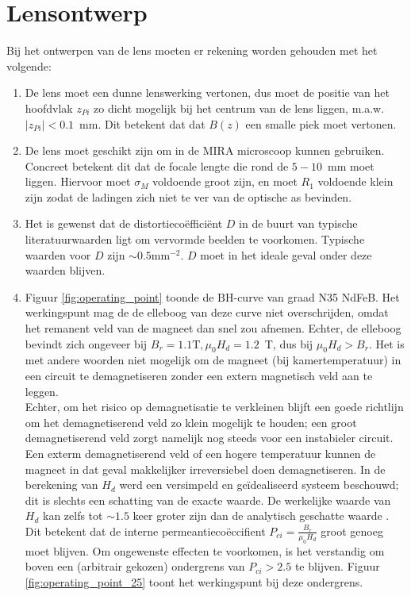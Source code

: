 \documentclass[we,twoside,openright,a4paper,11pt]{uantwerpenbamathesis}
\begin{document}
\section{Lensontwerp}\label{ch:lensontwerp}
Bij het ontwerpen van de lens moeten er rekening worden gehouden met het volgende:
\begin{enumerate}
    \item De lens moet een dunne lenswerking vertonen, dus moet de positie van het hoofdvlak $z_{Pi}$ zo dicht mogelijk bij het centrum van de lens liggen, m.a.w. $\left|z_{Pi}\right|<0.1$~mm. Dit betekent dat dat $B(z)$ een smalle piek moet vertonen.

    \item De lens moet geschikt zijn om in de MIRA microscoop kunnen gebruiken. Concreet betekent dit dat de focale lengte die rond de $5-10$~mm moet liggen. Hiervoor moet $\sigma_M$ voldoende groot zijn, en moet $R_1$ voldoende klein zijn zodat de ladingen zich niet te ver van de optische as bevinden.
    
    \item Het is gewenst dat de distortiecoëfficiënt $D$ in de buurt van typische literatuurwaarden ligt om vervormde beelden te voorkomen. Typische waarden voor $D$ zijn $\sim0.5\mathrm{mm}^{-2}$\cite{Abbas_2016}. $D$ moet in het ideale geval onder deze waarden blijven.

    \item Figuur \ref{fig:operating_point} toonde de $\mathrm{BH}$-curve van graad N35 NdFeB. Het werkingspunt mag de de elleboog van deze curve niet overschrijden, omdat het remanent veld van de magneet dan snel zou afnemen. Echter, de elleboog bevindt zich ongeveer bij $B_r=1.1\mathrm{T}, \mu_0 H_d = 1.2$~T, dus bij $\mu_0 H_d>B_r$. Het is met andere woorden niet mogelijk om de magneet (bij kamertemperatuur) in een circuit te demagnetiseren zonder een extern magnetisch veld aan te leggen.\\

    Echter, om het risico op demagnetisatie te verkleinen blijft een goede richtlijn om het demagnetiserend veld zo klein mogelijk te houden; een groot demagnetiserend veld zorgt namelijk nog steeds voor een instabieler circuit. Een exterm demagnetiserend veld of een hogere temperatuur kunnen de magneet in dat geval makkelijker irreversiebel doen demagnetiseren. In de berekening van $H_d$ werd een versimpeld en geïdealiseerd systeem beschouwd; dit is slechts een schatting van de exacte waarde. De werkelijke waarde van $H_d$ kan zelfs tot $\sim1.5$ keer groter zijn dan de analytisch geschatte waarde \cite{MagnetFAQ}. Dit betekent dat de interne permeantiecoëccifient $P_{ci}=\frac{B_r}{\mu_0 H_d}$ groot genoeg moet blijven. Om ongewenste effecten te voorkomen, is het verstandig om boven een (arbitrair gekozen) ondergrens van $P_{ci}>2.5$ te blijven. Figuur \ref{fig:operating_point_25} toont het werkingspunt bij deze ondergrens.


\end{enumerate}
\end{document}
